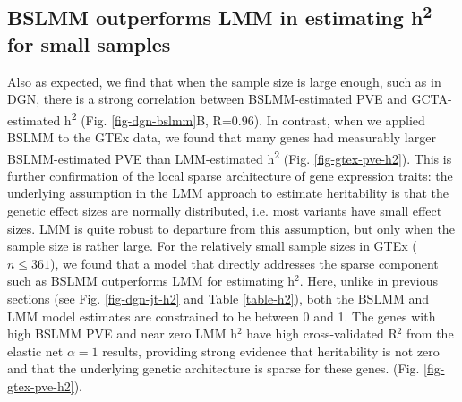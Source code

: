 \documentclass[10pt,letterpaper]{article}
\begin{document}
\subsection*{BSLMM outperforms LMM in estimating h\textsuperscript{2}  for small samples}

Also as expected, we find that when the sample size is large enough, such as in DGN, there is a strong correlation between BSLMM-estimated PVE and GCTA-estimated h\textsuperscript{2} (Fig. \ref{fig-dgn-bslmm}B, R=0.96). In contrast, when we applied BSLMM to the GTEx data, we found that many genes had measurably larger BSLMM-estimated PVE than LMM-estimated h\textsuperscript{2} (Fig. \ref{fig-gtex-pve-h2}). This is further confirmation of the local sparse architecture of gene expression traits: the underlying assumption in the LMM approach to estimate heritability is that the genetic effect sizes are normally distributed, i.e. most variants have small effect sizes. LMM is quite robust to departure from this assumption, but only when the sample size is rather large. For the relatively small sample sizes in GTEx (\(n \leq 361\)), we found that a model that directly addresses the sparse component such as BSLMM outperforms LMM for estimating h$^2$. Here, unlike in previous sections (see Fig. \ref{fig-dgn-jt-h2} and Table \ref{table-h2}), both the BSLMM and LMM model estimates are constrained to be between 0 and 1. The genes with high BSLMM PVE and near zero LMM h$^2$ have high cross-validated R$^2$ from the elastic net \(\alpha=1\) results, providing strong evidence that heritability is not zero and that the underlying genetic architecture is sparse for these genes. (Fig. \ref{fig-gtex-pve-h2}).
\end{document}
